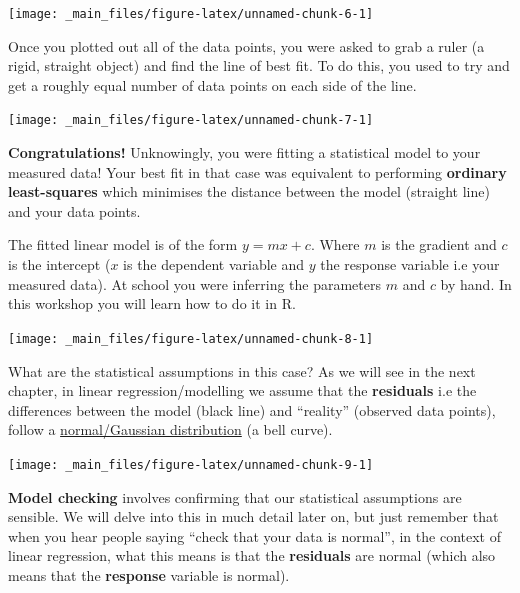 \documentclass[]{book}
\theoremstyle{definition}
\theoremstyle{definition}
\theoremstyle{definition}
\theoremstyle{remark}
\begin{document}
\begin{center}\texttt{[image: \_main\_files/figure-latex/unnamed-chunk-6-1]} \end{center}

Once you plotted out all of the data points, you were asked to grab a
ruler (a rigid, straight object) and find the line of best fit. To do
this, you used to try and get a roughly equal number of data points on
each side of the line.

\begin{center}\texttt{[image: \_main\_files/figure-latex/unnamed-chunk-7-1]} \end{center}

\textbf{Congratulations!} Unknowingly, you were fitting a statistical
model to your measured data! Your best fit in that case was equivalent
to performing \textbf{ordinary least-squares} which minimises the
distance between the model (straight line) and your data points.

The fitted linear model is of the form \(y = mx + c\). Where \(m\) is
the gradient and \(c\) is the intercept (\(x\) is the dependent variable
and \(y\) the response variable i.e your measured data). At school you
were inferring the parameters \(m\) and \(c\) by hand. In this workshop
you will learn how to do it in R.

\begin{center}\texttt{[image: \_main\_files/figure-latex/unnamed-chunk-8-1]} \end{center}

What are the statistical assumptions in this case? As we will see in the
next chapter, in linear regression/modelling we assume that the
\textbf{residuals} i.e the differences between the model (black line)
and ``reality'' (observed data points), follow a
\href{https://en.wikipedia.org/wiki/Normal_distribution}{normal/Gaussian
distribution} (a bell curve).

\begin{center}\texttt{[image: \_main\_files/figure-latex/unnamed-chunk-9-1]} \end{center}

\textbf{Model checking} involves confirming that our statistical
assumptions are sensible. We will delve into this in much detail later
on, but just remember that when you hear people saying ``check that your
data is normal'', in the context of linear regression, what this means
is that the \textbf{residuals} are normal (which also means that the
\textbf{response} variable is normal).
\end{document}

